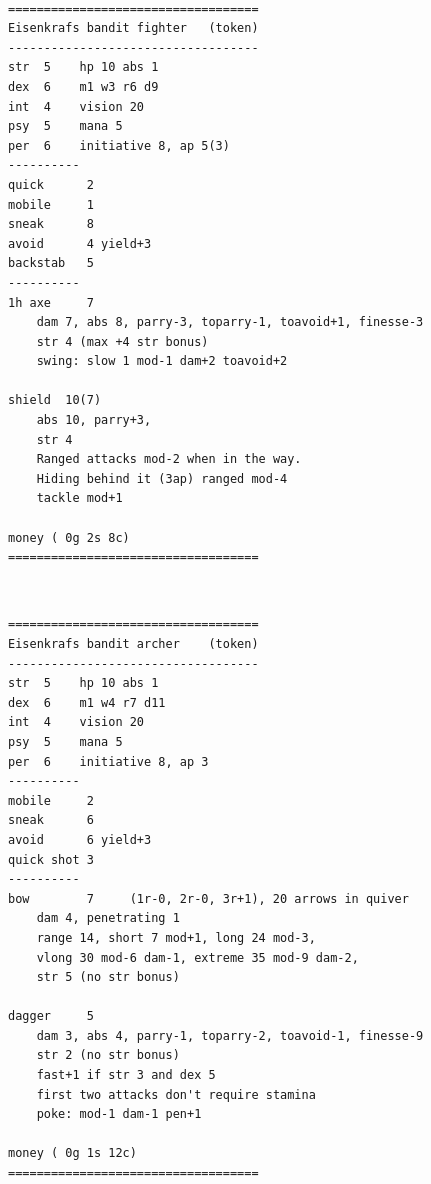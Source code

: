\

\goodbreak \begin{samepage} \vsmall \begin{verbatim}
===================================
Eisenkrafs bandit fighter   (token)
-----------------------------------
str  5    hp 10 abs 1
dex  6    m1 w3 r6 d9
int  4    vision 20
psy  5    mana 5
per  6    initiative 8, ap 5(3)
----------
quick      2
mobile     1
sneak      8
avoid      4 yield+3
backstab   5
----------
1h axe     7
    dam 7, abs 8, parry-3, toparry-1, toavoid+1, finesse-3
    str 4 (max +4 str bonus)
    swing: slow 1 mod-1 dam+2 toavoid+2

shield  10(7)
    abs 10, parry+3,
    str 4
    Ranged attacks mod-2 when in the way.
    Hiding behind it (3ap) ranged mod-4
    tackle mod+1

money ( 0g 2s 8c)
===================================
\end{verbatim} \normalsize \end{samepage}

\

\goodbreak \begin{samepage} \vsmall \begin{verbatim}
===================================
Eisenkrafs bandit archer    (token)
-----------------------------------
str  5    hp 10 abs 1
dex  6    m1 w4 r7 d11
int  4    vision 20
psy  5    mana 5
per  6    initiative 8, ap 3
----------
mobile     2
sneak      6
avoid      6 yield+3
quick shot 3
----------
bow        7     (1r-0, 2r-0, 3r+1), 20 arrows in quiver
    dam 4, penetrating 1
    range 14, short 7 mod+1, long 24 mod-3,
    vlong 30 mod-6 dam-1, extreme 35 mod-9 dam-2,
    str 5 (no str bonus)

dagger     5
    dam 3, abs 4, parry-1, toparry-2, toavoid-1, finesse-9
    str 2 (no str bonus)
    fast+1 if str 3 and dex 5
    first two attacks don't require stamina
    poke: mod-1 dam-1 pen+1

money ( 0g 1s 12c)
===================================
\end{verbatim} \normalsize \end{samepage}

\

\flushbottom


















